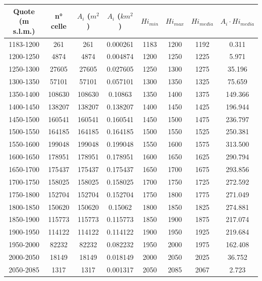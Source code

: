 \begin{table}[H]
    \begin{tabular}{cccccccc}
        \toprule
    Quote (m s.l.m.) & n° celle & $A_i$ ($m^2$) & $A_i$ ($km^2$) & $Hi_{min}$ & $Hi_{max}$ & $Hi_{media}$ & $A_i \cdot Hi_{media}$ \\
   \midrule
    1183-1200                 & 261      & 261     & 0.000261 & 1183   & 1200   & 1192     & 0.311         \\
    1200-1250                 & 4874     & 4874    & 0.004874 & 1200   & 1250   & 1225     & 5.971         \\
    1250-1300                 & 27605    & 27605   & 0.027605 & 1250   & 1300   & 1275     & 35.196        \\
    1300-1350                 & 57101    & 57101   & 0.057101 & 1300   & 1350   & 1325     & 75.659        \\
    1350-1400                 & 108630   & 108630  & 0.10863  & 1350   & 1400   & 1375     & 149.366       \\
    1400-1450                 & 138207   & 138207  & 0.138207 & 1400   & 1450   & 1425     & 196.944       \\
    1450-1500                 & 160541   & 160541  & 0.160541 & 1450   & 1500   & 1475     & 236.797       \\
    1500-1550                 & 164185   & 164185  & 0.164185 & 1500   & 1550   & 1525     & 250.381       \\
    1550-1600                 & 199048   & 199048  & 0.199048 & 1550   & 1600   & 1575     & 313.500       \\
    1600-1650                 & 178951   & 178951  & 0.178951 & 1600   & 1650   & 1625     & 290.794       \\
    1650-1700                 & 175437   & 175437  & 0.175437 & 1650   & 1700   & 1675     & 293.856       \\
    1700-1750                 & 158025   & 158025  & 0.158025 & 1700   & 1750   & 1725     & 272.592       \\
    1750-1800                 & 152704   & 152704  & 0.152704 & 1750   & 1800   & 1775     & 271.049       \\
    1800-1850                 & 150620   & 150620  & 0.15062  & 1800   & 1850   & 1825     & 274.881       \\
    1850-1900                 & 115773   & 115773  & 0.115773 & 1850   & 1900   & 1875     & 217.074       \\
    1900-1950                 & 114122   & 114122  & 0.114122 & 1900   & 1950   & 1925     & 219.684       \\
    1950-2000                 & 82232    & 82232   & 0.082232 & 1950   & 2000   & 1975     & 162.408       \\
    2000-2050                 & 18149    & 18149   & 0.018149 & 2000   & 2050   & 2025     & 36.752        \\
    2050-2085                 & 1317     & 1317    & 0.001317 & 2050   & 2085   & 2067     & 2.723        \\
    \bottomrule
\end{tabular}
    \end{table}

